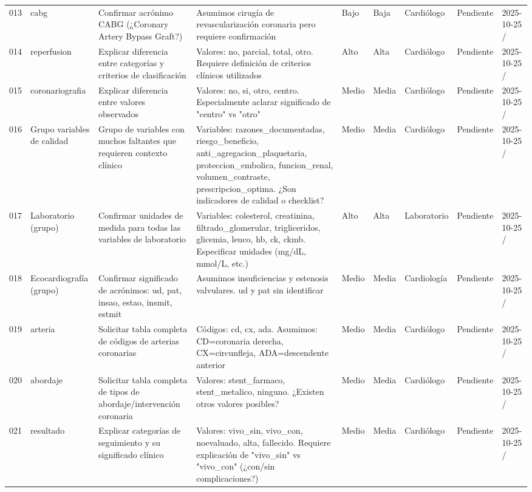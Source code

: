 \documentclass[11pt,a4paper]{article}
\begin{document}
\begin{longtable}{@{}L{0.035\textwidth} L{0.10\textwidth} L{0.265\textwidth} L{0.17\textwidth} L{0.05\textwidth} L{0.05\textwidth} L{0.095\textwidth} L{0.065\textwidth} L{0.075\textwidth}@{}}
013 & cabg & Confirmar acrónimo CABG (¿Coronary Artery Bypass Graft?) & Asumimos cirugía de revascularización coronaria pero requiere confirmación & Bajo & Baja & Cardiólogo & Pendiente & 2025-10-25 / \\
014 & reperfusion & Explicar diferencia entre categorías y criterios de clasificación & Valores: no, parcial, total, otro. Requiere definición de criterios clínicos utilizados & Alto & Alta & Cardiólogo & Pendiente & 2025-10-25 / \\
015 & coronariografia & Explicar diferencia entre valores observados & Valores: no, si, otro, centro. Especialmente aclarar significado de "centro" vs "otro" & Medio & Media & Cardiólogo & Pendiente & 2025-10-25 / \\
016 & Grupo variables de calidad & Grupo de variables con muchos faltantes que requieren contexto clínico & Variables: razones\_documentadas, riesgo\_beneficio, anti\_agregacion\_plaquetaria, proteccion\_embolica, funcion\_renal, volumen\_contraste, prescripcion\_optima. ¿Son indicadores de calidad o checklist? & Medio & Media & Cardiólogo & Pendiente & 2025-10-25 / \\
017 & Laboratorio (grupo) & Confirmar unidades de medida para todas las variables de laboratorio & Variables: colesterol, creatinina, filtrado\_glomerular, trigliceridos, glicemia, leuco, hb, ck, ckmb. Especificar unidades (mg/dL, mmol/L, etc.) & Alto & Alta & Laboratorio & Pendiente & 2025-10-25 / \\
018 & Ecocardiografía (grupo) & Confirmar significado de acrónimos: ud, pat, insao, estao, insmit, estmit & Asumimos insuficiencias y estenosis valvulares. ud y pat sin identificar & Medio & Media & Cardiología & Pendiente & 2025-10-25 / \\
019 & arteria & Solicitar tabla completa de códigos de arterias coronarias & Códigos: cd, cx, ada. Asumimos: CD=coronaria derecha, CX=circunfleja, ADA=descendente anterior & Medio & Media & Cardiólogo & Pendiente & 2025-10-25 / \\
020 & abordaje & Solicitar tabla completa de tipos de abordaje/intervención coronaria & Valores: stent\_farmaco, stent\_metalico, ninguno. ¿Existen otros valores posibles? & Medio & Media & Cardiólogo & Pendiente & 2025-10-25 / \\
021 & resultado & Explicar categorías de seguimiento y su significado clínico & Valores: vivo\_sin, vivo\_con, noevaluado, alta, fallecido. Requiere explicación de "vivo\_sin" vs "vivo\_con" (¿con/sin complicaciones?) & Medio & Media & Cardiólogo & Pendiente & 2025-10-25 / \\

\end{longtable}
\end{document}
